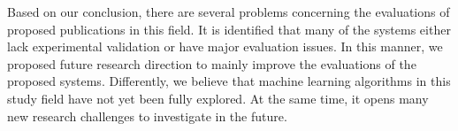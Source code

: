 \documentclass[english]{tktltiki}
\begin{document}
Based on our conclusion, there are several problems concerning the evaluations of proposed publications in this field. It is identified that many of the systems either lack experimental validation or have major evaluation issues. In this manner, we proposed future research direction to mainly improve the evaluations of the proposed systems. Differently, we believe that machine learning algorithms in this study field have not yet been fully explored. At the same time, it opens many new research challenges to investigate in the future.
\newpage
\nocite{*}
%
%


%



\lastpage
\end{document}
